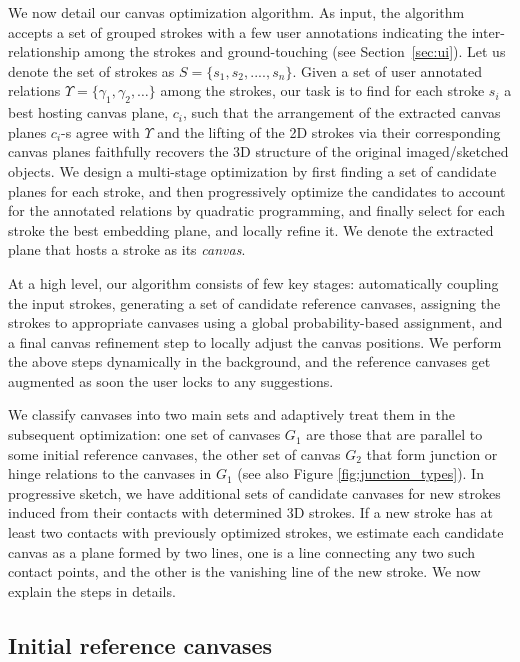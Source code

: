 We now detail our canvas optimization algorithm. As input, the algorithm accepts a set of grouped strokes with a few user annotations indicating the inter-relationship among the strokes and ground-touching (see Section~\ref{sec:ui}). Let us denote the set of strokes as $S = \{s_1,s_2,....,s_n\}$. Given a set of user annotated relations $\Upsilon = \{\gamma_1, \gamma_2, \dots\}$ among the strokes, our task is to find for each stroke $s_i$ a best hosting canvas plane, $c_i$, such that the arrangement of the extracted canvas planes $c_i$-s agree with $\Upsilon$ and the lifting of the 2{D} strokes via their corresponding canvas planes faithfully recovers the 3{D} structure of the original imaged/sketched objects. We design a multi-stage optimization  by first finding a set of candidate planes for each stroke, and then progressively optimize the candidates to account for the annotated relations by quadratic programming, and finally select for each stroke the best embedding plane, and locally refine it. We denote the extracted plane that hosts a stroke as its \emph{canvas}.

At a high level, our algorithm consists of few key stages: automatically coupling the input strokes, generating a set of candidate reference canvases, assigning the strokes to appropriate canvases using a global probability-based assignment, and a final canvas refinement step to locally adjust the canvas positions.
%
We perform the above steps dynamically in the background, and the reference canvases get augmented as soon the user locks to any suggestions.

We classify  canvases into two main sets and adaptively treat them in the subsequent optimization: one set of canvases $G_1$ are those that are parallel to some initial reference canvases, the other set of canvas $G_2$ that form junction or hinge relations to the canvases in $G_1$ (see also Figure \ref{fig:junction_types}). In progressive sketch, we have additional sets of candidate canvases for new strokes induced from their contacts with determined 3D strokes. If a new stroke has at least two contacts with previously optimized strokes, we estimate each candidate canvas as a plane formed by two lines, one is a line connecting any two such contact points, and the other is the vanishing line of the new stroke. We now explain the steps in details.



\subsection{Initial reference canvases}

